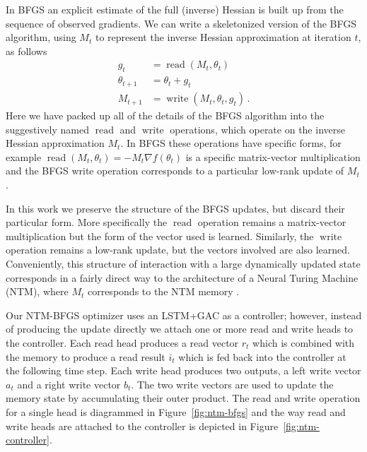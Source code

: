 In BFGS an explicit estimate of the full (inverse) Hessian is built up from the sequence of observed gradients.
We can write a skeletonized version of the BFGS algorithm, using $M_t$ to represent the inverse Hessian approximation at iteration $t$, as follows
\begin{align*}
g_t &= \operatorname{read}(M_t, \theta_t) \\
\theta_{t+1} &= \theta_{t} + g_t \\
M_{t+1} &= \operatorname{write}(M_t, \theta_t, g_t)
\,.
\end{align*}
Here we have packed up all of the details of the BFGS algorithm into the
suggestively named $\operatorname{read}$ and $\operatorname{write}$ operations,
which operate on the inverse Hessian approximation $M_t$.  In BFGS these
operations have specific forms, for example $\operatorname{read}(M_t, \theta_t)
= -M_t\nabla f(\theta_t)$ is a specific matrix-vector multiplication and
the BFGS write operation corresponds to a particular low-rank update of $M_t$.

In this work we preserve the structure of the BFGS updates, but discard their
particular form. More specifically the $\operatorname{read}$ operation remains
a matrix-vector multiplication but the form of the vector used is learned.
Similarly, the $\operatorname{write}$ operation remains a low-rank update, but the
vectors involved are also learned. Conveniently, this structure of interaction with
a large dynamically updated state corresponds in a fairly direct way to the
architecture of a Neural Turing Machine (NTM), where $M_t$ corresponds to the
NTM memory \citep{graves:2014}.

Our NTM-BFGS optimizer uses an LSTM+GAC as a controller;
however, instead of producing the update directly we attach one or
more read and write heads to the controller.
Each read head produces a read
vector $r_{t}$ which is combined with the memory to produce a read result $i_t$ which is fed back into the controller at the following time
step.  Each write head produces two outputs, a left write vector $a_t$
and a right write vector $b_t$. The two write vectors are used to update the
memory state by accumulating their outer product. The read and write operation for a single head is
diagrammed in Figure~\ref{fig:ntm-bfgs} and the way read and write heads are attached to the controller
is depicted in Figure~\ref{fig:ntm-controller}.


